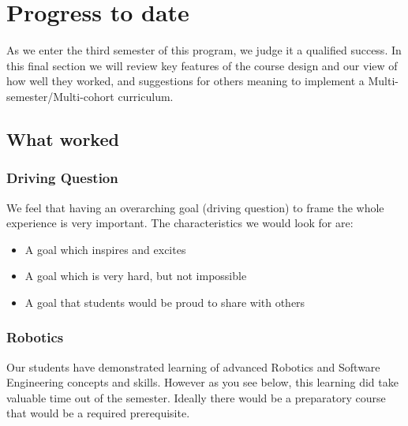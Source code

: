 \section{Progress to date}
As we enter the third semester of this program, we judge it a qualified success. In this final section we will review key features of the course design and our view of how well they worked, and suggestions for others meaning to implement a Multi-semester/Multi-cohort curriculum.
\subsection{What worked}
\subsubsection{Driving Question}
We feel that having an overarching goal (driving question) to frame the whole experience is very important. The characteristics we would look for are:
\begin{itemize}
\item A goal which inspires and excites
\item A goal which is very hard, but not impossible
\item A goal that students would be proud to share with others
\end{itemize}

\subsubsection{Robotics} Our students have demonstrated learning of advanced Robotics and Software Engineering concepts and skills. However as you see below, this learning did take valuable time out of the semester. Ideally there would be a preparatory course that would be a required prerequisite.
